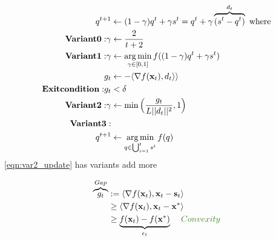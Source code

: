     \begin{align}
      q^{t + 1} &\gets (1 - \gamma) q^t + \gamma s^t = q^t + \gamma\overbrace{(s^t - q^t)}^{d_t} 
      \textrm{ where}\nonumber\\
      \mathbf{Variant 0:} 
      \gamma &\gets \frac{2}{t + 2} \\
      \mathbf{Variant 1:}
      \gamma &\gets \operatorname*{arg\,min}\limits_{\gamma \in [0, 1]} f((1 - \gamma) q^t + \gamma s^t)
      \label{eqn:update_lsearch} \\
      g_t &\gets -\langle \nabla f(\mathbf{x}_t), d_t \rangle \rangle \nonumber\\
      \mathbf{Exit condition:} g_t &< \delta \nonumber\\
      \mathbf{Variant 2:} \gamma &\gets \min \Big(\frac{g_t}{L ||d_t|| ^2}, 1\Big)
      \label{eqn:var2_update} \\
      \mathbf{Variant 3:} \nonumber\\
      q^{t + 1} &\gets \operatorname*{arg\,min}\limits_{q \in \bigcup_{i=1}^{t}{s^t}}f(q)
      \label{eqn:var3_fc} \\
    \end{align}
    \ref{eqn:var2_update} has variants \cite{pedregosa2018frank} \cite{Demyanov70} \TODO add more

     \INPROGRESS
    \begin{align}
      \overbrace{g_t}^{Gap} &:= \langle \grad f(\bx_t), \bx_t - \bs_t \rangle \nonumber\\
                            &\geq  \langle \grad f(\bx_t), \bx_t - \bx^{*} \rangle \nonumber\\
                            &\geq \underbrace{f(\bx_t) - f(\bx^{*})}_{\epsilon_t} \hspace{4mm} \comment{Convexity} \\
    \end{align}

